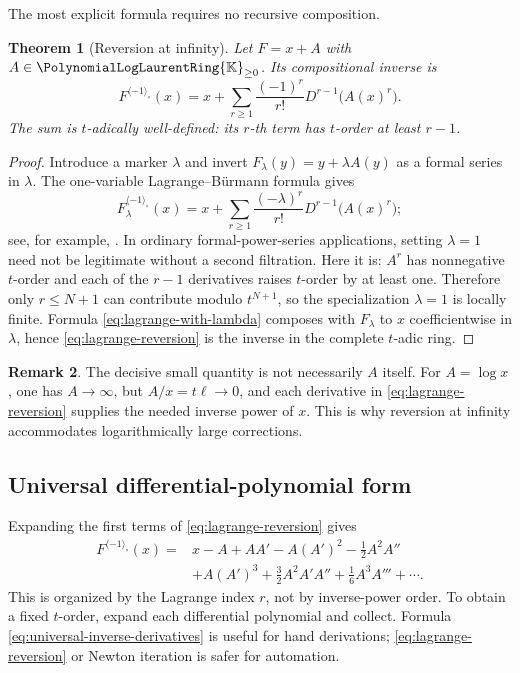 \documentclass[11pt,oneside]{article}
\numberwithin{equation}{section}
\newtheorem{theorem}{Theorem}[section]
\theoremstyle{definition}
\newtheorem{remark}[theorem]{Remark}
\newcommand{\K}{\mathbb{K}}
\newcommand{\PL}{\PolynomialLogLaurentRing{\K}}
\newcommand{\rev}{\langle-1\rangle_{\circ}}
\begin{document}
The most explicit formula requires no recursive composition.

\begin{theorem}[Reversion at infinity]\label{thm:lagrange-reversion}
Let \(F=x+A\) with \(A\in\PL_{\ge0}\).  Its compositional inverse is
\begin{equation}\label{eq:lagrange-reversion}
\boxed{
  F^{\rev}(x)
  =x+\sum_{r\ge1}\frac{(-1)^r}{r!}
       D^{r-1}\bigl(A(x)^r\bigr).
}
\end{equation}
The sum is \(t\)-adically well-defined: its \(r\)-th term has
\(t\)-order at least \(r-1\).
\end{theorem}

\begin{proof}
Introduce a marker \(\lambda\) and invert
\(F_\lambda(y)=y+\lambda A(y)\) as a formal series in \(\lambda\).  The
one-variable Lagrange--B\"urmann formula gives
\begin{equation}\label{eq:lagrange-with-lambda}
  F_\lambda^{\rev}(x)
  =x+\sum_{r\ge1}\frac{(-\lambda)^r}{r!}
       D^{r-1}\bigl(A(x)^r\bigr);
\end{equation}
see, for example, \cite{GesselLagrange}.  In ordinary formal-power-series
applications, setting \(\lambda=1\) need not be legitimate without a second
filtration.  Here it is: \(A^r\) has nonnegative \(t\)-order and each of the
\(r-1\) derivatives raises \(t\)-order by at least one.  Therefore only
\(r\le N+1\) can contribute modulo \(t^{N+1}\), so the specialization
\(\lambda=1\) is locally finite.  Formula \eqref{eq:lagrange-with-lambda}
composes with \(F_\lambda\) to \(x\) coefficientwise in \(\lambda\), hence
\eqref{eq:lagrange-reversion} is the inverse in the complete \(t\)-adic ring.
\end{proof}

\begin{remark}
The decisive small quantity is not necessarily \(A\) itself.  For
\(A=\log x\), one has \(A\to\infty\), but \(A/x=t\ell\to0\), and each derivative
in \eqref{eq:lagrange-reversion} supplies the needed inverse power of \(x\).
This is why reversion at infinity accommodates logarithmically large
corrections.
\end{remark}

\subsection{Universal differential-polynomial form}

Expanding the first terms of \eqref{eq:lagrange-reversion} gives
\begin{align}
 F^{\rev}(x)={}&x-A+AA'
 -A(A')^2-\frac12A^2A''\nonumber\\
 &+A(A')^3+\frac32A^2A'A''+\frac16A^3A'''
 +\cdots.\label{eq:universal-inverse-derivatives}
\end{align}
This is organized by the Lagrange index \(r\), not by inverse-power order.  To
obtain a fixed \(t\)-order, expand each differential polynomial and collect.
Formula \eqref{eq:universal-inverse-derivatives} is useful for hand derivations;
\eqref{eq:lagrange-reversion} or Newton iteration is safer for automation.
\end{document}
